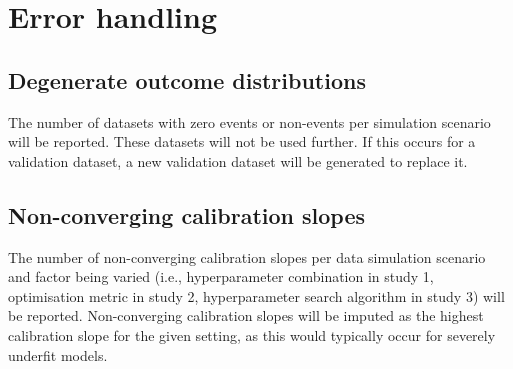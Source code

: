 \documentclass{article}
\begin{document}
\section{Error handling}

\subsection{Degenerate outcome distributions}

The number of datasets with zero events or non-events per simulation scenario will be reported. These datasets will not be used further. If this occurs for a validation dataset, a new validation dataset will be generated to replace it.

\subsection{Non-converging calibration slopes}

The number of non-converging calibration slopes per data simulation scenario and factor being varied (i.e., hyperparameter combination in study 1, optimisation metric in study 2, hyperparameter search algorithm in study 3) will be reported. Non-converging calibration slopes will be imputed as the highest calibration slope for the given setting, as this would typically occur for severely underfit models.

\newpage
\printbibliography
\end{document}
